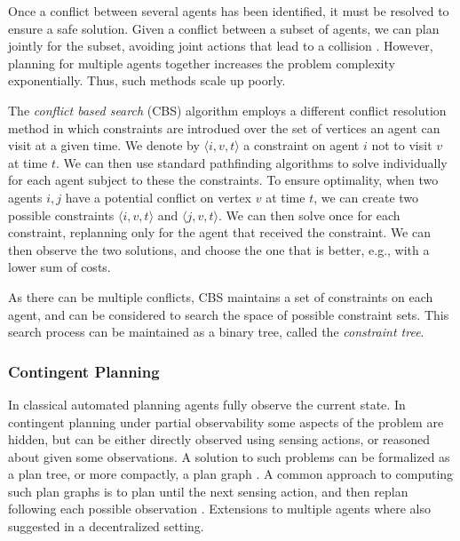 \documentclass[letterpaper]{article} %
\begin{document}
Once a conflict between several agents has been identified, it must be resolved to ensure a safe solution. Given a conflict between a subset of agents, we can plan jointly for the subset, avoiding joint actions that lead to a collision \cite{standley2010finding}. However, planning for multiple agents together increases the problem complexity exponentially. Thus, such methods scale up poorly.

The \emph{conflict based search} (CBS) \cite{sharon2015conflict} algorithm employs a different conflict resolution method in which constraints are introdued over the set of vertices an agent can visit at a given time. We denote by $\langle i,v,t \rangle$ a constraint on agent $i$ not to visit $v$ at time $t$.
We can then use standard pathfinding algorithms to solve individually for each agent subject to these the constraints. To ensure optimality, when two agents $i,j$ have a potential conflict on vertex $v$ at time $t$, we can create two possible constraints $\langle i,v,t \rangle$ and $\langle j,v,t \rangle$. We can then solve once for each constraint, replanning only for the agent that received the constraint. We can then observe the two solutions, and choose the one that is better, e.g., with a lower sum of costs.

As there can be multiple conflicts, CBS maintains a set of constraints on each agent, and can be considered to search the space of possible constraint sets. This search process can be maintained as a binary tree, called the \emph{constraint tree}.
 


\subsubsection{Contingent Planning}

In classical automated planning agents fully observe the current state. In contingent planning under partial observability \cite{albore2009translation,BrafmanS12,bonet2011planning} some aspects of the problem are hidden, but can be either directly observed using sensing actions, or reasoned about given some observations.
A solution to such problems can be formalized as a plan tree, or more compactly, a plan graph \cite{muise2014computing,MaliahKS21}.
A common approach to computing such plan graphs is to plan until the next sensing action, and then replan following each possible observation \cite{bonet2011planning,MaliahKS21}. Extensions to multiple agents where also suggested \cite{brafman2013qualitative,bazinin2018iterative} in a decentralized setting.
\end{document}
